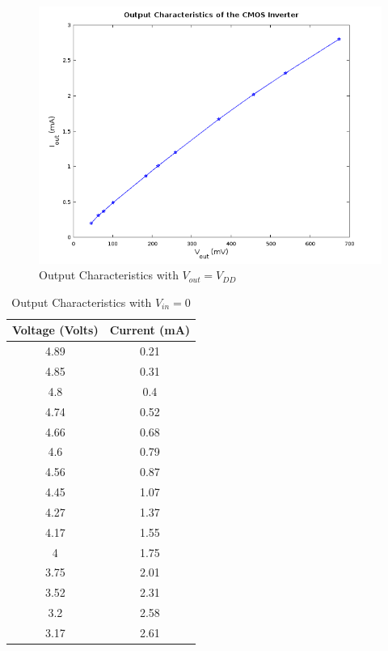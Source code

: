 \documentclass[a4paper, 11pt]{article}
\begin{document}
\begin{figure}[H]
\centering
\includegraphics[scale=0.6]{Output_1}
\caption{Output Characteristics with $V_{out} = V_{DD}$}
\end{figure}

\begin{table}[H]
\centering
\begin{tabular}{| c | c |}
\hline
\bf Voltage (Volts) & \bf Current (mA)\\
\hline
4.89 & 0.21 \\4.85 & 0.31 \\4.8 & 0.4 \\4.74 & 0.52 \\4.66 & 0.68 \\4.6 & 0.79 \\4.56 & 0.87 \\4.45 & 1.07 \\4.27 & 1.37 \\4.17 & 1.55 \\4 & 1.75 \\3.75 & 2.01 \\3.52 & 2.31 \\3.2 & 2.58 \\3.17 & 2.61\\
\hline
\end{tabular}
\caption{Output Characteristics with $V_{in} = 0$}
\end{table}
\end{document}
